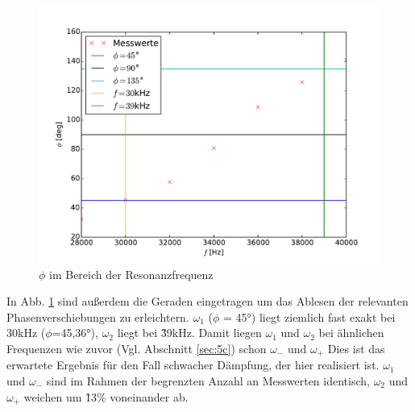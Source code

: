\begin{figure}
  \centering
  \includegraphics[width=\textwidth]{5d2.pdf}
  \caption{$\phi$ im Bereich der Resonanzfrequenz}
  \label{fig:5dlin}
\end{figure}

In Abb. \ref{fig:5dlin} sind außerdem die Geraden eingetragen um das Ablesen
der relevanten Phasenverschiebungen zu erleichtern.
$\omega_1$ ($\phi$ = 45°) liegt ziemlich fast exakt bei 30kHz ($\phi$=45,36°),
$\omega_2$ liegt bei \~ 39kHz. Damit liegen $\omega_1$ und $\omega_2$ bei
ähnlichen Frequenzen wie zuvor (Vgl. Abschnitt \ref{sec:5c}) schon $\omega_-$
und $\omega_+$ Dies ist das erwartete Ergebnis für den Fall schwacher
Dämpfung, der hier realisiert ist. $\omega_1$ und $\omega_-$ sind im Rahmen
der begrenzten Anzahl an Messwerten identisch, $\omega_2$ und $\omega_+$ weichen
um \~13\% voneinander ab.
